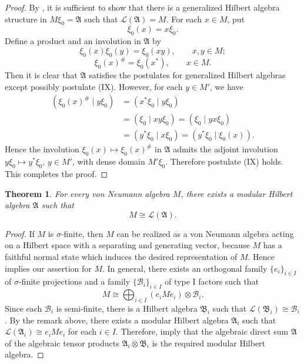 \documentclass[12pt,b5paper,twoside]{article}
\theoremstyle{takesaki}
\newtheorem{theorem}{Theorem}[section]
\numberwithin{equation}{section}
\begin{document}
\begin{proof}
By , it is sufficient to show that there is a
generalized Hilbert algebra structure in $M\xi_0=\mathfrak A$ such
that $\mathcal L(\mathfrak A)=M$.  For each $x\in M$, put
\[
  \xi_0(x)=x\xi_0.
\]
Define a product and an involution in $\mathfrak A$ by
\[
 \xi_0(x)\xi_0(y)=\xi_0(xy),
 \qquad x,y\in M;
\]
\[
 \xi_0(x)^{\#}=\xi_0(x^*),
 \qquad x\in M.
\]
Then it is clear that $\mathfrak A$ satisfies the postulates for
generalized Hilbert algebras except possibly postulate (IX).
However, for each $y\in M'$, we have
\begin{align*}
 (\xi_0(x)^{\#}\mid y\xi_0)
 &=(x^*\xi_0\mid y\xi_0)\\
 &=(\xi_0\mid xy\xi_0)=(\xi_0\mid yx\xi_0)\\
 &=(y^*\xi_0\mid x\xi_0)=(y^*\xi_0\mid\xi_0(x)).
\end{align*}
Hence the involution $\xi_0(x)\mapsto\xi_0(x)^{\#}$ in
$\mathfrak A$ admits the adjoint involution
$y\xi_0\mapsto y^*\xi_0$, $y\in M'$, with dense domain $M'\xi_0$.
Therefore postulate (IX) holds.  This completes the proof.
\end{proof}

\begin{theorem}\label{thm:12.2}
For every von Neumann algebra $M$, there exists a modular Hilbert
algebra $\mathfrak A$ such that
\[
  M\cong\mathcal L(\mathfrak A).
\]
\end{theorem}

\begin{proof}
If $M$ is $\sigma$-finite, then $M$ can be realized as a von Neumann
algebra acting on a Hilbert space with a separating and generating
vector, because $M$ has a faithful normal state which induces the
desired representation of $M$.  Hence  implies our
assertion for $M$.  In general, there exists an orthogonal family
$\{e_i\}_{i\in I}$ of $\sigma$-finite projections and a family
$\{\mathscr B_i\}_{i\in I}$ of type I factors such that
\[
 M\cong\bigoplus_{i\in I}(e_iMe_i)\otimes\mathscr B_i.
\]
Since each $\mathscr B_i$ is semi-finite, there is a Hilbert algebra
$\mathfrak B_i$ such that
$\mathcal L(\mathfrak B_i)\cong\mathscr B_i$.  By the remark above,
there
exists a modular Hilbert algebra $\mathfrak A_i$ such that
$\mathcal L(\mathfrak A_i)\cong e_iMe_i$ for each $i\in I$.
Therefore,  imply that the algebraic direct
sum $\mathfrak A$ of the algebraic tensor products
$\mathfrak A_i\otimes\mathfrak B_i$ is the required modular Hilbert
algebra.
\end{proof}
\end{document}
